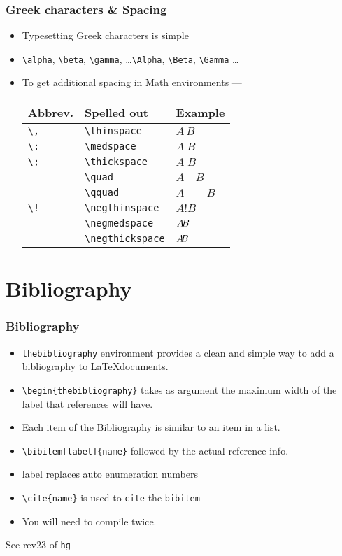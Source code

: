 \documentclass{beamer}
\newcommand{\typ}[1]{\lstinline{#1}}
\begin{document}
\begin{frame}[fragile]
  \frametitle{Greek characters \& Spacing}
  \begin{itemize}
  \item Typesetting Greek characters is simple
  \item \lstinline+\alpha+, \lstinline+\beta+, \lstinline+\gamma+,
    \ldots \lstinline+\Alpha+, \lstinline+\Beta+, \lstinline+\Gamma+
    \ldots 
  \item To get additional spacing in Math environments ---
\begin{center}
\begin{tabular}{|l|l|l|}
\hline
 Abbrev. & Spelled out & Example  \\
\hline
 \lstinline+\,+ & \lstinline+\thinspace+ & $A\,B$ \\
\hline
 \lstinline+\:+ & \lstinline+\medspace+ & $A\:B$ \\
\hline
 \lstinline+\;+ & \lstinline+\thickspace+ & $A\;B$ \\
\hline
   & \lstinline+\quad+ & $A \quad B$ \\
\hline
   & \lstinline+\qquad+ & $A \qquad B$ \\
\hline
 \lstinline+\!+ & \lstinline+\negthinspace+ & $A!B$ \\
\hline
   & \lstinline+\negmedspace+ & $A \negmedspace B$ \\
\hline
   & \lstinline+\negthickspace+ & $A \negthickspace B$ \\
\hline

\end{tabular}
\end{center}
  \end{itemize}
\end{frame}

\section{Bibliography}
\begin{frame}[fragile]
  \frametitle{Bibliography}
  \begin{itemize}
  \item \lstinline+thebibliography+ environment provides a clean and
    simple way to add a bibliography to \LaTeX documents. 
  \item \lstinline+\begin{thebibliography}+ takes as argument the
    maximum width of the label that references will have. 
  \item Each item of the Bibliography is similar to an item in a
    list. 
  \item \lstinline+\bibitem[label]{name}+ followed by the actual
    reference info. 
  \item label replaces auto enumeration numbers 
  \item \lstinline+\cite{name}+ is used to \lstinline+cite+ the
    \lstinline+bibitem+ 
  \item You will need to compile twice. 
  \end{itemize}
  \tiny See rev23 of \typ{hg}    
\end{frame}
\end{document}
